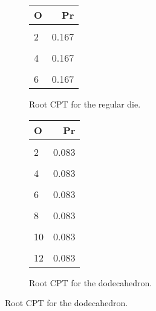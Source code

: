 \documentclass[10pt,]{scrartcl}
\begin{document}
\begin{figure}
\hspace{0.2cm}\begin{subfigure}[!ht]{0.25\textwidth}
\begin{table}[H]
\centering
\begin{tabular}{lr}
\toprule
O & Pr\\
\midrule
\cellcolor{gray!6}{1} & \cellcolor{gray!6}{0.167}\\
2 & 0.167\\
\cellcolor{gray!6}{3} & \cellcolor{gray!6}{0.167}\\
4 & 0.167\\
\cellcolor{gray!6}{5} & \cellcolor{gray!6}{0.167}\\
6 & 0.167\\
\bottomrule
\end{tabular}
\end{table}
\caption{Root CPT for the regular die.}
\end{subfigure} 
\hspace{0.2cm} \begin{subfigure}[!ht]{0.25\textwidth}
\begin{table}[H]
\centering
\begin{tabular}{lr}
\toprule
O & Pr\\
\midrule
\cellcolor{gray!6}{1} & \cellcolor{gray!6}{0.083}\\
2 & 0.083\\
\cellcolor{gray!6}{3} & \cellcolor{gray!6}{0.083}\\
4 & 0.083\\
\cellcolor{gray!6}{5} & \cellcolor{gray!6}{0.083}\\
6 & 0.083\\
\cellcolor{gray!6}{7} & \cellcolor{gray!6}{0.083}\\
8 & 0.083\\
\cellcolor{gray!6}{9} & \cellcolor{gray!6}{0.083}\\
10 & 0.083\\
\cellcolor{gray!6}{11} & \cellcolor{gray!6}{0.083}\\
12 & 0.083\\
\bottomrule
\end{tabular}
\end{table}
\caption{Root CPT for the dodecahedron.}
\end{subfigure}


\end{figure}
\end{document}
